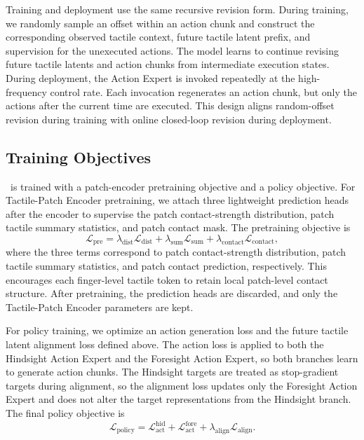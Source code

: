 Training and deployment use the same recursive revision form. During training, we randomly sample an offset within an action chunk and construct the corresponding observed tactile context, future tactile latent prefix, and supervision for the unexecuted actions. The model learns to continue revising future tactile latents and action chunks from intermediate execution states. During deployment, the Action Expert is invoked repeatedly at the high-frequency control rate. Each invocation regenerates an action chunk, but only the actions after the current time are executed. This design aligns random-offset revision during training with online closed-loop revision during deployment.

\subsection{Training Objectives}

\systemname\ is trained with a patch-encoder pretraining objective and a policy objective. For Tactile-Patch Encoder pretraining, we attach three lightweight prediction heads after the encoder to supervise the patch contact-strength distribution, patch tactile summary statistics, and patch contact mask. The pretraining objective is
\begin{equation}
    \mathcal{L}_{\mathrm{pre}}
    =
    \lambda_{\mathrm{dist}}\mathcal{L}_{\mathrm{dist}}
    +
    \lambda_{\mathrm{sum}}\mathcal{L}_{\mathrm{sum}}
    +
    \lambda_{\mathrm{contact}}\mathcal{L}_{\mathrm{contact}},
\end{equation}
where the three terms correspond to patch contact-strength distribution, patch tactile summary statistics, and patch contact prediction, respectively. This encourages each finger-level tactile token to retain local patch-level contact structure. After pretraining, the prediction heads are discarded, and only the Tactile-Patch Encoder parameters are kept.

For policy training, we optimize an action generation loss and the future tactile latent alignment loss defined above. The action loss is applied to both the Hindsight Action Expert and the Foresight Action Expert, so both branches learn to generate action chunks. The Hindsight targets are treated as stop-gradient targets during alignment, so the alignment loss updates only the Foresight Action Expert and does not alter the target representations from the Hindsight branch. The final policy objective is
\begin{equation}
    \mathcal{L}_{\mathrm{policy}}
    =
    \mathcal{L}_{\mathrm{act}}^{\mathrm{hid}}
    +
    \mathcal{L}_{\mathrm{act}}^{\mathrm{fore}}
    +
    \lambda_{\mathrm{align}}\mathcal{L}_{\mathrm{align}}.
\end{equation}